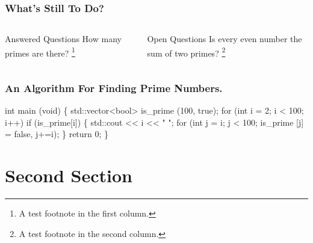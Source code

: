 \documentclass[
]{beamer}
\begin{document}
\begin{frame}
\frametitle{What’s Still To Do?}
\begin{columns}[t]
  \begin{block}{Answered Questions}
    How many primes are there?
    \footnote[frame]{A test footnote in the first column.}
  \end{block}
  \pause
  \begin{block}{Open Questions}
    Is every even number the sum of two primes?
    \footnote[frame]{A test footnote in the second column.}
  \end{block}
\end{columns}
\end{frame}

\begin{frame}[fragile]
\frametitle{An Algorithm For Finding Prime Numbers.}
\begin{semiverbatim}
int main (void) \{
  \alert<2>{std::}vector<bool> is_prime (100, true);
      for (int i = 2; i < 100; i++)
        if (is_prime[i]) \{
          \alert<2>{std::}cout << i << " ";
          for (int j = i; j < 100;
            is_prime [j] = false, j+=i);
        \}
  return 0;
\}
\end{semiverbatim}
\end{frame}

\section{Second Section}
\end{document}
